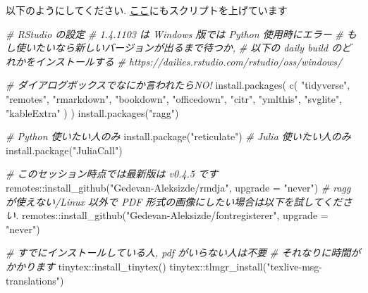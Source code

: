 \documentclass[
]{bxjsarticle}
\newenvironment{Shaded}{\begin{snugshade}}{\end{snugshade}}
\newcommand{\AttributeTok}[1]{\textcolor[rgb]{0.77,0.63,0.00}{#1}}
\newcommand{\CommentTok}[1]{\textcolor[rgb]{0.56,0.35,0.01}{\textit{#1}}}
\newcommand{\FunctionTok}[1]{\textcolor[rgb]{0.00,0.00,0.00}{#1}}
\newcommand{\NormalTok}[1]{#1}
\newcommand{\SpecialCharTok}[1]{\textcolor[rgb]{0.00,0.00,0.00}{#1}}
\newcommand{\StringTok}[1]{\textcolor[rgb]{0.31,0.60,0.02}{#1}}
\begin{document}
以下のようにしてください. \href{https://github.com/Gedevan-Aleksizde/tokyor-91-rmd/blob/main/rmd-setup.R}{ここ}にもスクリプトを上げています

\begin{Shaded}
\begin{Highlighting}[numbers=left,,]
\CommentTok{\# RStudio の設定}
\CommentTok{\# 1.4.1103 は Windows 版では Python 使用時にエラー}
\CommentTok{\# もし使いたいなら新しいバージョンが出るまで待つか,}
\CommentTok{\# 以下の daily build のどれかをインストールする}
\CommentTok{\# https://dailies.rstudio.com/rstudio/oss/windows/}

\CommentTok{\# ダイアログボックスでなにか言われたらNO!}
\FunctionTok{install.packages}\NormalTok{(}
  \FunctionTok{c}\NormalTok{(}
    \StringTok{"tidyverse"}\NormalTok{,}
    \StringTok{"remotes"}\NormalTok{,}
    \StringTok{"rmarkdown"}\NormalTok{,}
    \StringTok{"bookdown"}\NormalTok{,}
    \StringTok{"officedown"}\NormalTok{,}
    \StringTok{"citr"}\NormalTok{,}
    \StringTok{"ymlthis"}\NormalTok{,}
    \StringTok{"svglite"}\NormalTok{,}
    \StringTok{"kableExtra"}
\NormalTok{  )}
\NormalTok{)}
\FunctionTok{install.packages}\NormalTok{(}\StringTok{"ragg"}\NormalTok{)}

\CommentTok{\# Python 使いたい人のみ}
\FunctionTok{install.package}\NormalTok{(}\StringTok{"reticulate"}\NormalTok{)}
\CommentTok{\# Julia 使いたい人のみ}
\FunctionTok{install.package}\NormalTok{(}\StringTok{"JuliaCall"}\NormalTok{)}

\CommentTok{\# このセッション時点では最新版は v0.4.5 です}
\NormalTok{remotes}\SpecialCharTok{::}\FunctionTok{install\_github}\NormalTok{(}\StringTok{"Gedevan{-}Aleksizde/rmdja"}\NormalTok{, }\AttributeTok{upgrade =} \StringTok{"never"}\NormalTok{)}
\CommentTok{\# ragg が使えない/Linux 以外で PDF 形式の画像にしたい場合は以下を試してください.}
\NormalTok{remotes}\SpecialCharTok{::}\FunctionTok{install\_github}\NormalTok{(}\StringTok{"Gedevan{-}Aleksizde/fontregisterer"}\NormalTok{, }\AttributeTok{upgrade =} \StringTok{"never"}\NormalTok{)}

\CommentTok{\# すでにインストールしている人, pdf がいらない人は不要}
\CommentTok{\# それなりに時間がかかります}
\NormalTok{tinytex}\SpecialCharTok{::}\FunctionTok{install\_tinytex}\NormalTok{()}
\NormalTok{tinytex}\SpecialCharTok{::}\FunctionTok{tlmgr\_install}\NormalTok{(}\StringTok{"texlive{-}msg{-}translations"}\NormalTok{)}
\end{Highlighting}
\end{Shaded}
\end{document}
